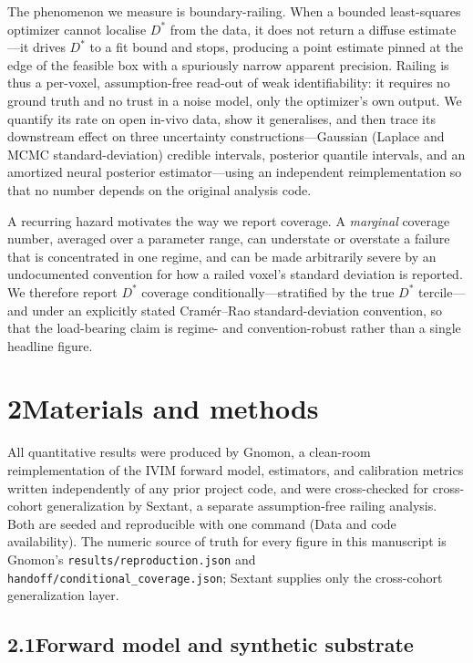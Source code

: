 \documentclass[11pt]{article}
\newcommand{\Dstar}{\ensuremath{D^{*}}}
\begin{document}
The phenomenon we measure is boundary-railing. When a bounded least-squares optimizer
cannot localise \Dstar{} from the data, it does not return a diffuse estimate---it drives
\Dstar{} to a fit bound and stops, producing a point estimate pinned at the edge of the
feasible box with a spuriously narrow apparent precision. Railing is thus a per-voxel,
assumption-free read-out of weak identifiability: it requires no ground truth and no
trust in a noise model, only the optimizer's own output. We quantify its rate on open
in-vivo data, show it generalises, and then trace its downstream effect on three
uncertainty constructions---Gaussian (Laplace and MCMC standard-deviation) credible
intervals, posterior quantile intervals, and an amortized neural posterior estimator---using
an independent reimplementation so that no number depends on the original analysis code.

A recurring hazard motivates the way we report coverage. A \emph{marginal} coverage
number, averaged over a parameter range, can understate or overstate a failure that is
concentrated in one regime, and can be made arbitrarily severe by an undocumented
convention for how a railed voxel's standard deviation is reported. We therefore report
\Dstar{} coverage conditionally---stratified by the true \Dstar{} tercile---and under an
explicitly stated Cram\'er--Rao standard-deviation convention, so that the load-bearing
claim is regime- and convention-robust rather than a single headline figure.

\section*{2\quad Materials and methods}

All quantitative results were produced by Gnomon, a clean-room reimplementation of the
IVIM forward model, estimators, and calibration metrics written independently of any
prior project code, and were cross-checked for cross-cohort generalization by Sextant, a
separate assumption-free railing analysis. Both are seeded and reproducible with one
command (Data and code availability). The numeric source of truth for every figure in
this manuscript is Gnomon's \texttt{results/reproduction.json} and
\texttt{handoff/conditional\_coverage.json}; Sextant supplies only the cross-cohort
generalization layer.

\subsection*{2.1\quad Forward model and synthetic substrate}
\end{document}
